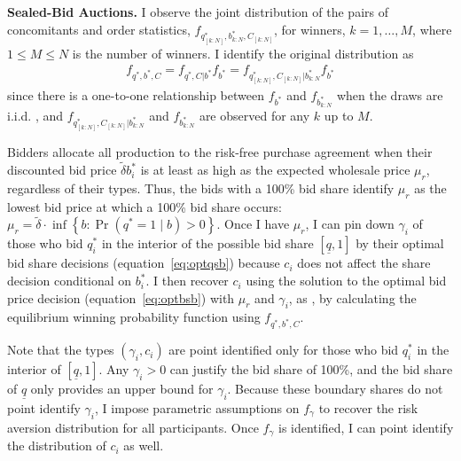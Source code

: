 \documentclass[12pt]{article}
\theoremstyle{definition} %
\begin{document}
\textbf{Sealed-Bid Auctions.} I observe the joint distribution of the pairs of concomitants and order statistics, $f_{q_{[k:N]}^\ast,b_{k:N}^\ast,C_{[k:N]}} $, for winners, $k=1,\dots,M $, where $1 \leq M \leq N$ is the number of winners. I identify the original distribution as
\begin{align*}
f_{q^\ast,b^\ast,C} = f_{q^\ast,C|b^\ast} f_{b^\ast} = f_{q_{[k:N]}^\ast,C_{[k:N]}|b_{k:N}^\ast} f_{b^\ast}
\end{align*}
since there is a one-to-one relationship between $f_{b^\ast} $ and $f_{b_{k:N}^\ast} $ when the draws are i.i.d. \citep{Athey2002}, and $f_{q_{[k:N]}^\ast,C_{[k:N]}|b_{k:N}^\ast} $ and $f_{b_{k:N}^\ast} $ are observed for any $k$ up to $M$.

Bidders allocate all production to the risk-free purchase agreement when their discounted bid price $\tilde{\delta} b_i^\ast $ is at least as high as the expected wholesale price $\mu_r $, regardless of their types. Thus, the bids with a 100\% bid share identify $\mu_r $ as the lowest bid price at which a 100\% bid share occurs: $\mu_r = \tilde{\delta} \cdot \inf\left\{b:\Pr(q^\ast=1\mid b)>0\right\} $. Once I have $\mu_r $, I can pin down $\gamma_i $ of those who bid $q_i^\ast $ in the interior of the possible bid share $[\underline{q},1]$ by their optimal bid share decisions (equation~\eqref{eq:optqsb}) because $c_i$ does not affect the share decision conditional on $b_i^\ast $. I then recover $c_i$ using the solution to the optimal bid price decision (equation~\eqref{eq:optbsb}) with $\mu_r $ and $\gamma_i $, as \citet*{Guerre2000}, by calculating the equilibrium winning probability function using $f_{q^\ast,b^\ast,C}$.

Note that the types $(\gamma_i,c_i) $ are point identified only for those who bid $q_i^\ast $ in the interior of $[\underline{q},1]$. Any $\gamma_i > 0 $ can justify the bid share of 100\%, and the bid share of $\underline{q}$ only provides an upper bound for $\gamma_i $. Because these boundary shares do not point identify $\gamma_i$, I impose parametric assumptions on $f_\gamma$ to recover the risk aversion distribution for all participants. Once $f_\gamma$ is identified, I can point identify the distribution of $c_i $ as well.
\end{document}
